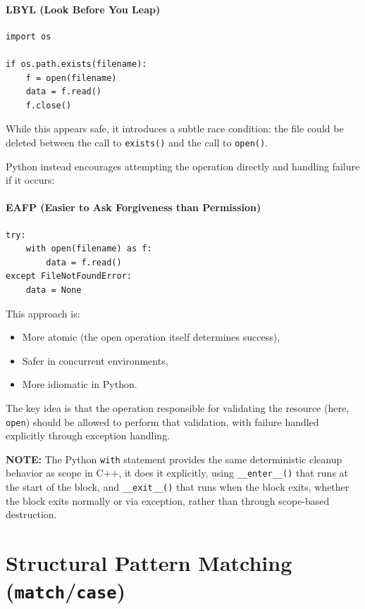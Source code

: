 \paragraph{LBYL (Look Before You Leap)}
\begin{verbatim}
import os

if os.path.exists(filename):
    f = open(filename)
    data = f.read()
    f.close()
\end{verbatim}

While this appears safe, it introduces a subtle race condition: the file could be deleted between the call to \texttt{exists()} and the call to \texttt{open()}.

\vspace{1em}

Python instead encourages attempting the operation directly and handling failure if it occurs:

\paragraph{EAFP (Easier to Ask Forgiveness than Permission)}
\begin{verbatim}
try:
    with open(filename) as f:
        data = f.read()
except FileNotFoundError:
    data = None
\end{verbatim}

This approach is:

\begin{itemize}
    \item More atomic (the open operation itself determines success),
    \item Safer in concurrent environments,
    \item More idiomatic in Python.
\end{itemize}

The key idea is that the operation responsible for validating the resource (here, \texttt{open}) should be allowed to perform that validation, with failure handled explicitly through exception handling.

\textbf{NOTE:} The Python \texttt{with} statement provides the same deterministic cleanup behavior as scope in C++, it does it explicitly, using \texttt{\_\_enter\_\_()} that runs at the start of the block, and \texttt{\_\_exit\_\_()} that runs when the block exits, whether the block exits normally or via exception, rather than through scope-based destruction.

\section{Structural Pattern Matching (\texttt{match}/\texttt{case})}

